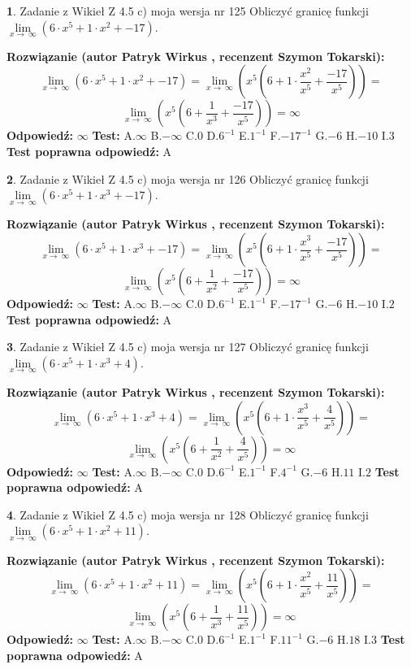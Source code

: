\documentclass[12pt, a4paper]{article}
\theoremstyle{definition} %
\newtheorem{zad}{}
\newcommand{\zadStart}[1]{\begin{zad}#1\newline}
\newcommand{\zadStop}{\end{zad}}
\newcommand{\rozwStart}[2]{\noindent \textbf{Rozwiązanie (autor #1 , recenzent #2): }\newline}
\newcommand{\rozwStop}{\newline}
\newcommand{\odpStart}{\noindent \textbf{Odpowiedź:}\newline}
\newcommand{\odpStop}{\newline}
\newcommand{\testStart}{\noindent \textbf{Test:}\newline}
\newcommand{\testStop}{\newline}
\newcommand{\kluczStart}{\noindent \textbf{Test poprawna odpowiedź:}\newline}
\newcommand{\kluczStop}{\newline}
\begin{document}
\zadStart{Zadanie z Wikieł Z 4.5 c) moja wersja nr 125}
Obliczyć granicę funkcji  $\lim\limits_{x\to\ \infty}(6 \cdot x^{5}+1 \cdot x^{2}+-17)$.
\zadStop
\rozwStart{Patryk Wirkus}{Szymon Tokarski}
$$\lim\limits_{x\to\ \infty}(6 \cdot x^{5}+1 \cdot x^{2}+-17) = \lim\limits_{x\to\ \infty}(x^{5}(6 +1 \cdot \frac{x^{2}}{x^{5}}+\frac{-17}{x^{5}})) =$$ $$\lim\limits_{x\to\ \infty}(x^{5}(6 +\frac{1}{x^{3}}+\frac{-17}{x^{5}})) =\infty$$
\rozwStop
\odpStart
$\infty$
\odpStop
\testStart
A.$\infty$ B.$-\infty$ C.$0$ D.$6^{-1}$ E.$1^{-1}$
F.$-17^{-1}$ G.$-6$
H.$-10$
I.$3$
\testStop
\kluczStart
A
\kluczStop



\zadStart{Zadanie z Wikieł Z 4.5 c) moja wersja nr 126}
Obliczyć granicę funkcji  $\lim\limits_{x\to\ \infty}(6 \cdot x^{5}+1 \cdot x^{3}+-17)$.
\zadStop
\rozwStart{Patryk Wirkus}{Szymon Tokarski}
$$\lim\limits_{x\to\ \infty}(6 \cdot x^{5}+1 \cdot x^{3}+-17) = \lim\limits_{x\to\ \infty}(x^{5}(6 +1 \cdot \frac{x^{3}}{x^{5}}+\frac{-17}{x^{5}})) =$$ $$\lim\limits_{x\to\ \infty}(x^{5}(6 +\frac{1}{x^{2}}+\frac{-17}{x^{5}})) =\infty$$
\rozwStop
\odpStart
$\infty$
\odpStop
\testStart
A.$\infty$ B.$-\infty$ C.$0$ D.$6^{-1}$ E.$1^{-1}$
F.$-17^{-1}$ G.$-6$
H.$-10$
I.$2$
\testStop
\kluczStart
A
\kluczStop



\zadStart{Zadanie z Wikieł Z 4.5 c) moja wersja nr 127}
Obliczyć granicę funkcji  $\lim\limits_{x\to\ \infty}(6 \cdot x^{5}+1 \cdot x^{3}+4)$.
\zadStop
\rozwStart{Patryk Wirkus}{Szymon Tokarski}
$$\lim\limits_{x\to\ \infty}(6 \cdot x^{5}+1 \cdot x^{3}+4) = \lim\limits_{x\to\ \infty}(x^{5}(6 +1 \cdot \frac{x^{3}}{x^{5}}+\frac{4}{x^{5}})) =$$ $$\lim\limits_{x\to\ \infty}(x^{5}(6 +\frac{1}{x^{2}}+\frac{4}{x^{5}})) =\infty$$
\rozwStop
\odpStart
$\infty$
\odpStop
\testStart
A.$\infty$ B.$-\infty$ C.$0$ D.$6^{-1}$ E.$1^{-1}$
F.$4^{-1}$ G.$-6$
H.$11$
I.$2$
\testStop
\kluczStart
A
\kluczStop



\zadStart{Zadanie z Wikieł Z 4.5 c) moja wersja nr 128}
Obliczyć granicę funkcji  $\lim\limits_{x\to\ \infty}(6 \cdot x^{5}+1 \cdot x^{2}+11)$.
\zadStop
\rozwStart{Patryk Wirkus}{Szymon Tokarski}
$$\lim\limits_{x\to\ \infty}(6 \cdot x^{5}+1 \cdot x^{2}+11) = \lim\limits_{x\to\ \infty}(x^{5}(6 +1 \cdot \frac{x^{2}}{x^{5}}+\frac{11}{x^{5}})) =$$ $$\lim\limits_{x\to\ \infty}(x^{5}(6 +\frac{1}{x^{3}}+\frac{11}{x^{5}})) =\infty$$
\rozwStop
\odpStart
$\infty$
\odpStop
\testStart
A.$\infty$ B.$-\infty$ C.$0$ D.$6^{-1}$ E.$1^{-1}$
F.$11^{-1}$ G.$-6$
H.$18$
I.$3$
\testStop
\kluczStart
A
\kluczStop
\end{document}
